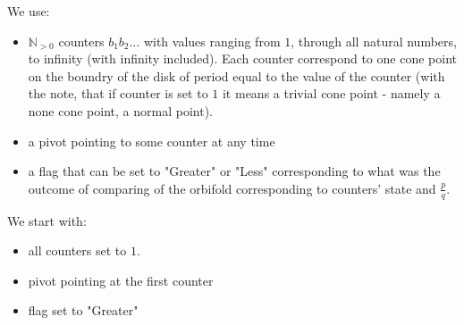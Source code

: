
We use: 
\begin{itemize}
\item $\mathbb{N}_{>0}$ counters $b_1b_2\dots$ 
with values ranging from $1$, through all natural numbers, to infinity 
(with infinity included). Each counter correspond to one cone point 
on the boundry of the disk of period equal to the value of the counter (with the note, that 
if counter is set to $1$ it means a trivial cone point - namely a none cone point, a normal point). 
\item a pivot pointing to some counter at any time
\item a flag that can be set to "Greater" or "Less" corresponding to what was 
the outcome of comparing \Eoc  of the orbifold corresponding to counters' state and 
$\frac{p}{q}$.  
\end{itemize}

We start with:
\begin{itemize}
\item all counters set to $1$. 
\item pivot pointing at the first counter
\item flag set to "Greater"
\end{itemize}

